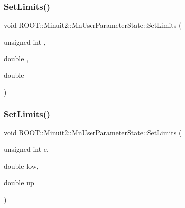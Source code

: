 \subsubsection{\texorpdfstring{SetLimits()}{SetLimits()}\hspace{0.1cm}{\footnotesize\ttfamily [1/4]}}
{\footnotesize\ttfamily void R\+O\+O\+T\+::\+Minuit2\+::\+Mn\+User\+Parameter\+State\+::\+Set\+Limits (\begin{DoxyParamCaption}\item[{unsigned int}]{,  }\item[{double}]{,  }\item[{double}]{ }\end{DoxyParamCaption})}

\mbox{\label{classROOT_1_1Minuit2_1_1MnUserParameterState_a0552162fb1f4fd9ae1be3ea7839fea5b}} 
\subsubsection{\texorpdfstring{SetLimits()}{SetLimits()}\hspace{0.1cm}{\footnotesize\ttfamily [2/4]}}
{\footnotesize\ttfamily void R\+O\+O\+T\+::\+Minuit2\+::\+Mn\+User\+Parameter\+State\+::\+Set\+Limits (\begin{DoxyParamCaption}\item[{unsigned int}]{e,  }\item[{double}]{low,  }\item[{double}]{up }\end{DoxyParamCaption})}

